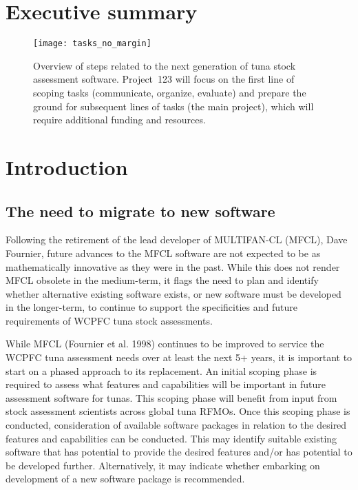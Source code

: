 \documentclass{SCreport}
\begin{document}
\wcpfctitlepage

\tableofcontents
\newpage

\section{Executive summary}

\begin{figure}[H]
  \centering
  \texttt{[image: tasks\_no\_margin]}
  \vspace{-1ex}
  \caption{Overview of steps related to the next generation of tuna stock
    assessment software. Project~123 will focus on the first line of scoping
    tasks (communicate, organize, evaluate) and prepare the ground for
    subsequent lines of tasks (the main project), which will require additional
    funding and resources.}\label{fig:diagram}
\end{figure}

\section{Introduction}

\subsection{The need to migrate to new software}

Following the retirement of the lead developer of MULTIFAN-CL (MFCL), Dave
Fournier, future advances to the MFCL software are not expected to be as
mathematically innovative as they were in the past. While this does not render
MFCL obsolete in the medium-term, it flags the need to plan and identify whether
alternative existing software exists, or new software must be developed in the
longer-term, to continue to support the specificities and future requirements of
WCPFC tuna stock assessments.

While MFCL (Fournier et al. 1998) continues to be improved to service the WCPFC
tuna assessment needs over at least the next 5+ years, it is important to start
on a phased approach to its replacement. An initial scoping phase is required to
assess what features and capabilities will be important in future assessment
software for tunas. This scoping phase will benefit from input from stock
assessment scientists across global tuna RFMOs. Once this scoping phase is
conducted, consideration of available software packages in relation to the
desired features and capabilities can be conducted. This may identify suitable
existing software that has potential to provide the desired features and/or has
potential to be developed further. Alternatively, it may indicate whether
embarking on development of a new software package is recommended.
\end{document}
